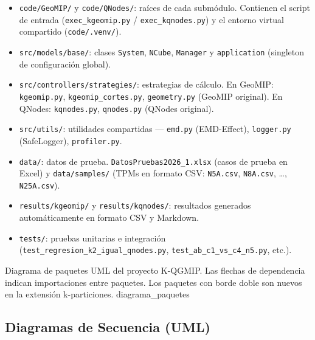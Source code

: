 \begin{itemize}
  \item \texttt{code/GeoMIP/} y \texttt{code/QNodes/}: raíces de cada submódulo.
        Contienen el script de entrada (\texttt{exec\_kgeomip.py} /
        \texttt{exec\_kqnodes.py}) y el entorno virtual compartido
        (\texttt{code/.venv/}).

  \item \texttt{src/models/base/}: clases \texttt{System}, \texttt{NCube},
        \texttt{Manager} y \texttt{application} (singleton de configuración global).

  \item \texttt{src/controllers/strategies/}: estrategias de cálculo.
        En GeoMIP: \texttt{kgeomip.py}, \texttt{kgeomip\_cortes.py},
        \texttt{geometry.py} (GeoMIP original).
        En QNodes: \texttt{kqnodes.py}, \texttt{qnodes.py} (QNodes original).

  \item \texttt{src/utils/}: utilidades compartidas — \texttt{emd.py}
        (EMD-Effect), \texttt{logger.py} (SafeLogger), \texttt{profiler.py}.

  \item \texttt{data/}: datos de prueba.
        \texttt{DatosPruebas2026\_1.xlsx} (casos de prueba en Excel) y
        \texttt{data/samples/} (TPMs en formato CSV: \texttt{N5A.csv},
        \texttt{N8A.csv}, \ldots, \texttt{N25A.csv}).

  \item \texttt{results/kgeomip/} y \texttt{results/kqnodes/}: resultados
        generados automáticamente en formato CSV y Markdown.

  \item \texttt{tests/}: pruebas unitarias e integración
        (\texttt{test\_regresion\_k2\_igual\_qnodes.py},
        \texttt{test\_ab\_c1\_vs\_c4\_n5.py}, etc.).
\end{itemize}

%
  {Diagrama de paquetes UML del proyecto K-QGMIP. Las flechas de dependencia
   indican importaciones entre paquetes. Los paquetes con borde doble son
   nuevos en la extensión k-particiones.}%
  {diagrama_paquetes}

\subsection{Diagramas de Secuencia (UML)}

